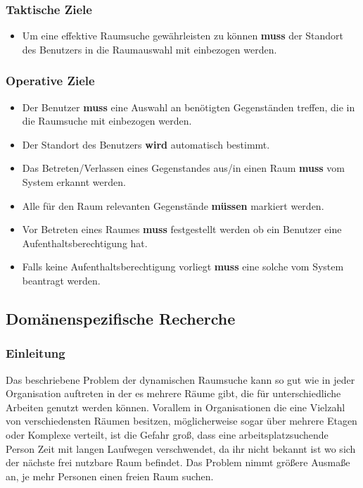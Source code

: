 \subsubsection{Taktische Ziele}
\label{sec:Taktische_Ziele}

\begin{itemize}
	\item Um eine effektive Raumsuche gewährleisten zu können \textbf{muss} der
	Standort des Benutzers in die Raumauswahl mit einbezogen werden.
\end{itemize}

\subsubsection{Operative Ziele}
\label{sec:Operative_Ziele}

\begin{itemize}
	\item Der Benutzer \textbf{muss} eine Auswahl an benötigten Gegenständen
	treffen, die in die Raumsuche mit einbezogen werden.
	\item Der Standort des Benutzers \textbf{wird} automatisch bestimmt.
	\item Das Betreten/Verlassen eines Gegenstandes aus/in einen Raum \textbf{muss}
	vom System erkannt werden.
	\item Alle für den Raum relevanten Gegenstände \textbf{müssen} markiert werden.
	\item Vor Betreten eines Raumes \textbf{muss} festgestellt werden ob ein
	Benutzer eine Aufenthaltsberechtigung hat.
	\item Falls keine Aufenthaltsberechtigung vorliegt \textbf{muss} eine solche
	\ggfs vom System beantragt werden.
\end{itemize}


\subsection{Domänenspezifische Recherche}
\label{sec:Domänenspezifische_Recherche}

\subsubsection{Einleitung}
\label{sec:Domänen_Einleitung}

Das beschriebene Problem der dynamischen Raumsuche kann so gut wie in jeder
Organisation auftreten in der es mehrere Räume gibt, die für unterschiedliche
Arbeiten genutzt werden können. Vorallem in Organisationen die eine Vielzahl
von verschiedensten Räumen besitzen, möglicherweise sogar über mehrere Etagen
oder Komplexe verteilt, ist die Gefahr groß, dass eine arbeitsplatzsuchende
Person Zeit mit langen Laufwegen verschwendet, da ihr nicht bekannt ist wo sich
der nächste frei nutzbare Raum befindet. Das Problem nimmt größere Ausmaße an,
je mehr Personen einen freien Raum suchen.

